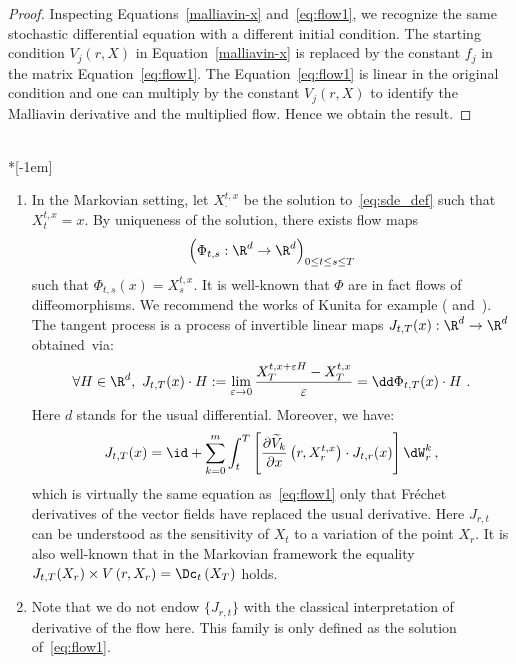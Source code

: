 \begin{proof}
Inspecting Equations~\eqref{malliavin-x} and~\eqref{eq:flow1}, we recognize the same stochastic differential equation with a different initial condition. The starting condition $ V_j\left(r, X\right)$ in Equation~\eqref{malliavin-x} is replaced by the constant $f_j$ in the matrix Equation~\eqref{eq:flow1}. The Equation~\eqref{eq:flow1} is linear in the original condition and one can multiply by the constant $ V_j\left(r,X \right)$ to identify the Malliavin derivative and the multiplied flow. Hence we obtain the result.
\end{proof}

\begin{rema}\label{rmk:tangent_markov}\ \\*[-1em]
\begin{enumerate}\romanenumi
\item \label{3.4.1}In the Markovian setting, let $X_{\cdot}^{t,x}$ be the solution to~\eqref{eq:sde_def} such that $X_{t}^{t,x}=x$. By uniqueness of the solution, there exists flow maps
\[
\left(\Phi_{t,s}: \R^d \rightarrow \R^d \right)_{0 \leq t \leq s \leq T}
\]
such that $\Phi_{t,s}(x) = X_s^{t,x}$. It is well-known that $\Phi$ are in fact flows of diffeomorphisms. We recommend the works of Kunita for example (\cite{K84} and~\cite[Chapter~4]{kunita1997}). The tangent process is a process of invertible linear maps $J_{t,T}(x): \R^d \rightarrow \R^d$ obtained~via:
\[
\forall H \in \R^d, \ J_{t,T}(x) \cdot H
:= \lim_{\varepsilon \rightarrow 0} \frac{X_T^{t, x+\varepsilon H} - X_T^{t,x}}{\varepsilon}
= \dd \Phi_{t,T} (x) \cdot H \ .
\]
Here $d$ stands for the usual differential. Moreover, we have:
\[
J_{t,T}(x) = \id + \sum_{k=0}^m \int_t^T
\left[\frac{\partial \widetilde{V}_k}{\partial x}\left(r, X_r^{t,x} \right) \cdot J_{t,r}(x) \right] \dW_r^k \,,
\]
which is virtually the same equation as~\eqref{eq:flow1} only that Fréchet derivatives of the vector fields have replaced the usual derivative. Here $J_{r,t}$ can be understood as the sensitivity of $X_t$ to a variation of the point $X_r$. It is also well-known that in the Markovian framework the equality
$
J_{t, T}(X_r) \times V\left(r,X_r\right) = \Dc_t \left(X_T \right)$ holds.
\item \label{3.4.2}Note that we do not endow $\{J_{r,t}\}$ with the classical interpretation of derivative of the flow here. This family is only defined as the solution of~\eqref{eq:flow1}.
\end{enumerate}
\end{rema}

